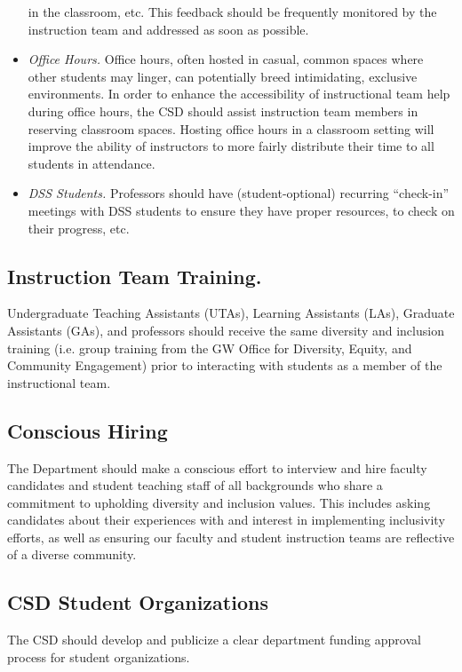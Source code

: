 \documentclass{article}
\begin{document}
\begin{itemize}
in the classroom, etc. This feedback should be frequently monitored by the instruction team and addressed as soon 
as possible. 
\item 
\emph{Office Hours.} 
Office hours, often hosted in casual, common spaces where other students may linger, 
can potentially breed intimidating, exclusive environments. In order to enhance the accessibility of 
instructional team help during office hours, the CSD should assist instruction team members in reserving 
classroom spaces. Hosting office hours in a classroom setting will improve the ability of instructors to more 
fairly distribute their time to all students in attendance. 

\item
\emph{DSS Students.} 
Professors should have (student-optional) recurring “check-in” meetings with DSS students to 
ensure they have proper resources, to check on their progress, etc.
\end{itemize}

\subsection{Instruction Team Training.} 
Undergraduate Teaching Assistants (UTAs), Learning Assistants (LAs), Graduate Assistants (GAs), and 
professors should receive the same diversity and inclusion training (i.e. group training from the GW Office 
for Diversity, Equity, and Community Engagement) prior to interacting with students as a member of the 
instructional team. 

\subsection{Conscious Hiring} 
The Department should make a conscious effort to interview and hire faculty candidates and 
student teaching staff of all backgrounds who share a commitment to upholding diversity and inclusion values. 
This includes asking candidates about their experiences with and interest in implementing inclusivity efforts, as well 
as ensuring our faculty and student instruction teams are reflective of a diverse community.

\subsection{CSD Student Organizations}
The CSD should develop and publicize a clear department funding approval process for student organizations.
\end{document}
